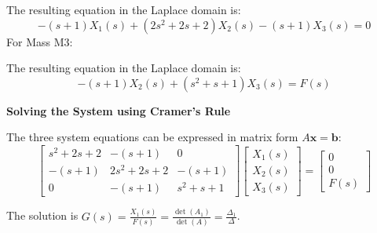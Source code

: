 \documentclass[11pt]{article}
\begin{document}
The resulting equation in the Laplace domain is:
\begin{equation}
-(s+1)X_1(s) + (2s^2 + 2s + 2)X_2(s) - (s+1)X_3(s) = 0 \tag{2}
\end{equation}
\newpage
{For Mass M3:}
\begin{figure}[h!]
\centering
{}
\end{figure}

The resulting equation in the Laplace domain is:
\begin{equation}
-(s+1)X_2(s) + (s^2 + s + 1)X_3(s) = F(s) \tag{3}
\end{equation}

\noindent\textbf{Solving the System using Cramer's Rule}
\vspace{12pt}

The three system equations can be expressed in matrix form $A\mathbf{x} = \mathbf{b}$:
$$
\begin{bmatrix}
s^2 + 2s + 2 & -(s+1) & 0 \\
-(s+1) & 2s^2 + 2s + 2 & -(s+1) \\
0 & -(s+1) & s^2 + s + 1
\end{bmatrix}
\begin{bmatrix}
X_1(s) \\
X_2(s) \\
X_3(s)
\end{bmatrix}
=
\begin{bmatrix}
0 \\
0 \\
F(s)
\end{bmatrix}
$$

The solution is $G(s) = \frac{X_1(s)}{F(s)} = \frac{\det(A_1)}{\det(A)} = \frac{\Delta_1}{\Delta}$.
\end{document}
